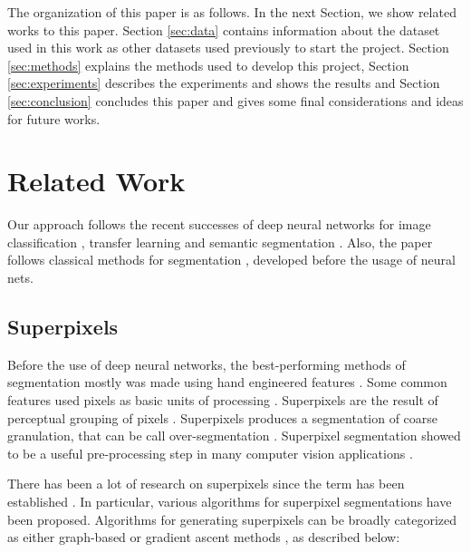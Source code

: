 \documentclass[10pt,twocolumn,letterpaper]{article}
\begin{document}
The organization of this paper is as follows. In the next Section, we show related works to this paper. Section \ref{sec:data} contains information about the dataset used in this work as other datasets used previously to start the project. Section \ref{sec:methods} explains the methods used to develop this project, Section \ref{sec:experiments} describes the experiments and shows the results and Section \ref{sec:conclusion} concludes this paper and gives some final considerations and ideas for future works.


\section{Related Work} \label{sec:related_work}

Our approach follows the recent successes of deep neural networks for image classification \cite{VGGNET} \cite{AHMED_SARMA}, transfer learning \cite{PRATT} \cite{WEISS2016} and semantic segmentation \cite{SEGNET} \cite{UNET} \cite{FULLY_CONVOLU}. Also, the paper follows classical methods for segmentation \cite{WATERSHEDS} \cite{SLIC} \cite{LATTICES} \cite{FELZENSZWALB}, developed before the usage of neural nets.

\subsection{Superpixels} \label{ssec:superpixels}

Before the use of deep neural networks, the best-performing methods of segmentation mostly was made using hand engineered features \cite{SEGNET}. Some common features used pixels as basic units of processing \cite{WANG201728}. Superpixels are the result of perceptual grouping of pixels \cite{WANG201728}. Superpixels produces a segmentation of coarse granulation, that can be call over-segmentation \cite{WANG201728}. Superpixel segmentation showed to be a useful pre-processing step in many computer vision applications \cite{WANG201728}.

There has been a lot of research on superpixels since the term has been established \cite{WANG201728}. In particular, various algorithms for superpixel segmentations have been proposed. Algorithms for generating superpixels can be broadly categorized as either graph-based or gradient ascent methods \cite{SLIC}, as described below:
\end{document}

